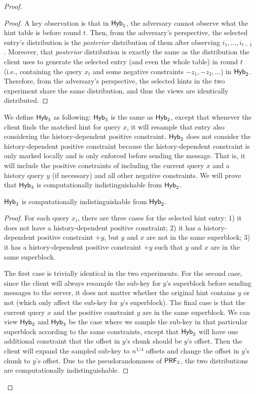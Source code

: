 \begin{proof}
\begin{proof}
        A key observation is that in ${\sf Hyb}_1$, the adversary cannot observe what the  hint table is before round $t$. 
        Then, from the adversary's perspective, the selected entry's distribution is the \textit{posterior} distribution of them after observing $i_1,\dots,i_{t-1}$. 
        Moreover, that \textit{posterior} distribution is exactly the same as the distribution the client uses to generate the selected entry (and even the whole table) in round $t$ (i.e., containing the query $x_t$ and some negative constraints $-z_1,-z_2,\dots$) in ${\sf Hyb}_2$.
        Therefore, from the adversary's perspective, the selected hints in the two experiment share the same distribution, and thus the views are identically distributed.
        
        
    \end{proof}
    
    
    We define ${\sf Hyb}_3$ as following: ${\sf Hyb}_3$ is the same as ${\sf Hyb}_2$, except that whenever the client finds the matched hint for query $x$, it will resample that entry also considering the history-dependent positive constraint. ${\sf Hyb}_2$ does not consider the history-dependent positive constraint because the history-dependent constraint is only marked locally and is only enforced before sending the message. That is, it will include the positive constraints of including the current query $x$ and a history query $y$ (if necessary) and all other negative constraints.
    We will prove that ${\sf Hyb}_3$ is computationally indistinguishable from ${\sf Hyb}_2$. 
    
    \begin{myclaim}
        ${\sf Hyb}_3$ is computationally indistinguishable from ${\sf Hyb}_2$.
    \end{myclaim}
    
    \begin{proof}
        
        For each query $x_t$, there are three cases for the selected hint entry: 1) it does not have a history-dependent positive constraint; 2) it has a history-dependent positive constraint $+y$, but $y$ and $x$ are not in the same superblock; 
        3) it has a history-dependent positive constraint $+y$ such that $y$ and $x$ are in the same superblock.
        
        The first case is trivially identical in the two experiments. 
        For the second case, since the client will always resample the sub-key for $y$'s superblock before sending messages to the server, it does not matter whether the original hint contains $y$ or not (which only affect the sub-key for $y$'s superblock).
        The final case is that the current query $x$ and the positive constraint $y$ are in the same superblock.
        We can view ${\sf Hyb}_2$ and ${\sf Hyb}_3$ be the case where we sample the sub-key in that particular superblock according to the same constraints, except that ${\sf Hyb}_3$ will have one additional constraint that the offset in $y$'s chunk should be $y$'s offset.
        Then the client will expand the sampled sub-key to $n^{1/4}$ offsets and change the offset in $y$'s chunk to $y$'s offset.
        Due to the pseudorandomness of $\mathsf{PRF}_2$, the two distributions are computationally indistinguishable.
        

\end{proof}
\end{proof}
